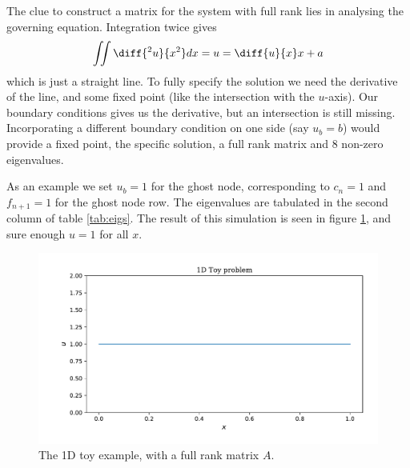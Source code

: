 \documentclass[sigconf]{acmart}
\begin{document}
The clue to construct a matrix for the system with full rank lies in analysing the governing equation. Integration twice gives
\begin{equation}\label{key}
	\iint \diff{^2 u}{x^2} dx = u = \diff{u}{x} x + a
\end{equation}
which is just a straight line. To fully specify the solution we need the derivative of the line, and some fixed point (like the intersection with the $ u $-axis). Our boundary conditions gives us the derivative, but an intersection is still missing. Incorporating a different boundary condition on one side (say $ u_b = b $) would provide a fixed point, the specific solution, a full rank matrix and 8 non-zero eigenvalues.

As an example we set $ u_b = 1 $ for the ghost node, corresponding to $ c_n = 1 $ and $ f_{n+1} = 1 $ for the ghost node row. The eigenvalues are tabulated in the second column of table \ref{tab:eigs}. The result of this simulation is seen in figure \ref{fig:1d_result.pdf}, and sure enough $ u = 1 $ for all $ x $.
\begin{figure}
	\centering
	\includegraphics[width=\linewidth]{1d_result.pdf}
	\caption{The 1D toy example, with a full rank matrix $ A $.}
	\label{fig:1d_result.pdf}
\end{figure}


 
\end{document}
